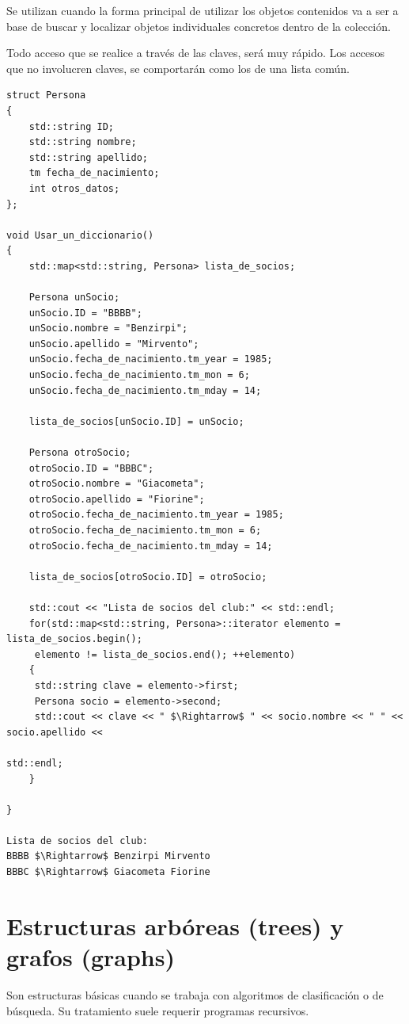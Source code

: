 \documentclass[spanish,12pt,a4paper,final,oneside]{book}
\begin{document}
Se utilizan cuando la forma principal de utilizar los objetos contenidos va a ser a base de buscar y localizar objetos individuales concretos dentro de la colección. 

Todo acceso que se realice a través de las claves, será muy rápido. Los accesos que no involucren claves, se comportarán como los de una lista común. 

\begin{lstlisting}[frame=single]
struct Persona
{
    std::string ID;
    std::string nombre;
    std::string apellido;
    tm fecha_de_nacimiento;
    int otros_datos;
};

void Usar_un_diccionario()
{
    std::map<std::string, Persona> lista_de_socios;

    Persona unSocio;
    unSocio.ID = "BBBB";
    unSocio.nombre = "Benzirpi";
    unSocio.apellido = "Mirvento";
    unSocio.fecha_de_nacimiento.tm_year = 1985;
    unSocio.fecha_de_nacimiento.tm_mon = 6;
    unSocio.fecha_de_nacimiento.tm_mday = 14;

    lista_de_socios[unSocio.ID] = unSocio;

    Persona otroSocio;
    otroSocio.ID = "BBBC";
    otroSocio.nombre = "Giacometa";
    otroSocio.apellido = "Fiorine";
    otroSocio.fecha_de_nacimiento.tm_year = 1985;
    otroSocio.fecha_de_nacimiento.tm_mon = 6;
    otroSocio.fecha_de_nacimiento.tm_mday = 14;

    lista_de_socios[otroSocio.ID] = otroSocio;

    std::cout << "Lista de socios del club:" << std::endl;
    for(std::map<std::string, Persona>::iterator elemento = lista_de_socios.begin();
   	 elemento != lista_de_socios.end(); ++elemento)
    {
   	 std::string clave = elemento->first;
   	 Persona socio = elemento->second;
   	 std::cout << clave << " $\Rightarrow$ " << socio.nombre << " " << socio.apellido << 
                                                                         std::endl;
    }

}

Lista de socios del club:
BBBB $\Rightarrow$ Benzirpi Mirvento
BBBC $\Rightarrow$ Giacometa Fiorine
\end{lstlisting}

\section{Estructuras arbóreas (trees) y grafos (graphs)}
Son estructuras básicas cuando se trabaja con algoritmos de clasificación o de búsqueda. Su tratamiento suele requerir programas recursivos.
\end{document}
